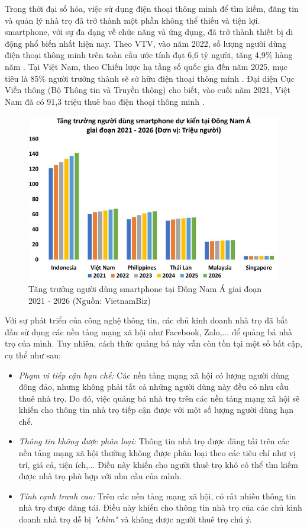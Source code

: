 Trong thời đại số hóa, việc sử dụng điện thoại thông minh để tìm kiếm, đăng tin và quản lý nhà trọ đã trở thành một phần không thể thiếu và tiện lợi. smartphone, với sự đa dạng về chức năng và ứng dụng, đã trở thành thiết bị di động phổ biến nhất hiện nay. Theo VTV, vào năm 2022, số lượng người dùng điện thoại thông minh trên toàn cầu ước tính đạt 6,6 tỷ người, tăng 4,9\% hàng năm \cite{smartphone2022}. Tại Việt Nam, theo Chiến lược hạ tầng số quốc gia đến năm 2025, mục tiêu là 85\% người trưởng thành sẽ sở hữu điện thoại thông minh \cite{chienluoc}. Đại diện Cục Viễn thông (Bộ Thông tin và Truyền thông) cho biết, vào cuối năm 2021, Việt Nam đã có 91,3 triệu thuê bao điện thoại thông minh \cite{vnsmartphone}.
\begin{figure}[h]
    \centering
    \includegraphics[width=1\textwidth]{Images/Overview/TangTruongSmartphone.jpg}
    \caption{Tăng trưởng người dùng smartphone tại Đông Nam Á giai đoạn 2021 - 2026 (Nguồn: VietnamBiz)}
\end{figure}
Với sự phát triển của công nghệ thông tin, các chủ kinh doanh nhà trọ đã bắt đầu sử dụng các nền tảng mạng xã hội như Facebook, Zalo,... để quảng bá nhà trọ của mình. Tuy nhiên, cách thức quảng bá này vẫn còn tồn tại một số bất cập, cụ thể như sau:
\begin{itemize}
    \item \textit{Phạm vi tiếp cận hạn chế:} Các nền tảng mạng xã hội có lượng người dùng đông đảo, nhưng không phải tất cả những người dùng này đều có nhu cầu thuê nhà trọ. Do đó, việc quảng bá nhà trọ trên các nền tảng mạng xã hội sẽ khiến cho thông tin nhà trọ tiếp cận được với một số lượng người dùng hạn chế.
    \item \textit{Thông tin không được phân loại:} Thông tin nhà trọ được đăng tải trên các nền tảng mạng xã hội thường không được phân loại theo các tiêu chí như vị trí, giá cả, tiện ích,... Điều này khiến cho người thuê trọ khó có thể tìm kiếm được nhà trọ phù hợp với nhu cầu của mình. 
    \item \textit{Tính cạnh tranh cao:} Trên các nền tảng mạng xã hội, có rất nhiều thông tin nhà trọ được đăng tải. Điều này khiến cho thông tin nhà trọ của các chủ kinh doanh nhà trọ dễ bị \textit{"chìm"} và không được người thuê trọ chú ý.
\end{itemize}

